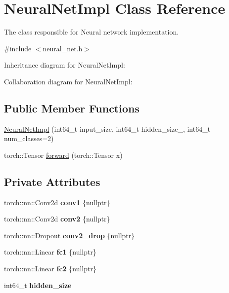 \hypertarget{class_neural_net_impl}{}\section{Neural\+Net\+Impl Class Reference}
\label{class_neural_net_impl}


The class responsible for Neural network implementation.  




{\ttfamily \#include $<$neural\+\_\+net.\+h$>$}



Inheritance diagram for Neural\+Net\+Impl\+:


Collaboration diagram for Neural\+Net\+Impl\+:
\subsection*{Public Member Functions}
\begin{DoxyCompactItemize}
\item 
\hyperlink{class_neural_net_impl_adc642ff317e5b828880aea3df16a4b23}{Neural\+Net\+Impl} (int64\+\_\+t input\+\_\+size, int64\+\_\+t hidden\+\_\+size\+\_\+, int64\+\_\+t num\+\_\+classes=2)
\item 
torch\+::\+Tensor \hyperlink{class_neural_net_impl_ae392a0bba51173dd708f8522ece17dae}{forward} (torch\+::\+Tensor x)
\end{DoxyCompactItemize}
\subsection*{Private Attributes}
\begin{DoxyCompactItemize}
\item 
\mbox{\label{class_neural_net_impl_a4ad265cf6b7c23b1ac2bf35ed34709de}} 
torch\+::nn\+::\+Conv2d {\bfseries conv1} \{nullptr\}
\item 
\mbox{\label{class_neural_net_impl_a7f2fdaa5cd22b7ee94a3a57ef70e0dc8}} 
torch\+::nn\+::\+Conv2d {\bfseries conv2} \{nullptr\}
\item 
\mbox{\label{class_neural_net_impl_ab0d179f56558cfcb3d6aba6caa9c80f8}} 
torch\+::nn\+::\+Dropout {\bfseries conv2\+\_\+drop} \{nullptr\}
\item 
\mbox{\label{class_neural_net_impl_a470a2d9ea6d8a8dc48885389126b347a}} 
torch\+::nn\+::\+Linear {\bfseries fc1} \{nullptr\}
\item 
\mbox{\label{class_neural_net_impl_a07e4353d9e399ceaca1cc4de5c08912f}} 
torch\+::nn\+::\+Linear {\bfseries fc2} \{nullptr\}
\item 
\mbox{\label{class_neural_net_impl_ad02e9e8ad7472c0ff5da7138c199f921}} 
int64\+\_\+t {\bfseries hidden\+\_\+size}
\end{DoxyCompactItemize}


